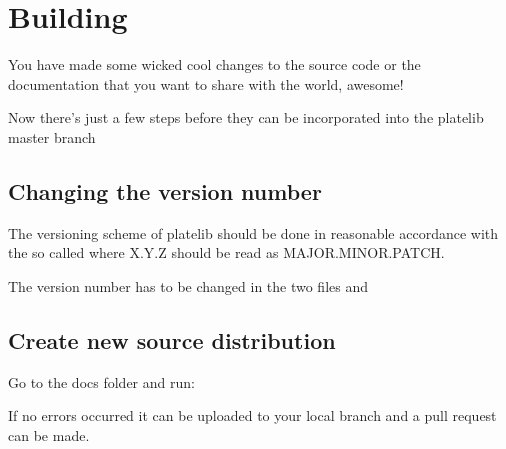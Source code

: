 \documentclass[letterpaper,10pt,english]{sphinxmanual}
\begin{document}
\section{Building}
\label{\detokenize{contribute:building}}\label{\detokenize{contribute:git}}
You have made some wicked cool changes to the source code
or the documentation that you want to share with the world, awesome!

Now there’s just a few steps before they can be incorporated into
the platelib master branch


\subsection{Changing the version number}
\label{\detokenize{contribute:changing-the-version-number}}
The versioning scheme of platelib should be done in reasonable
accordance with the so called  where
X.Y.Z should be read as MAJOR.MINOR.PATCH.

The version number has to be changed in the two files  and


\subsection{Create new source distribution}
\label{\detokenize{contribute:semantic-versioning}}\label{\detokenize{contribute:create-new-source-distribution}}
Go to the docs folder and run:

%
\begin{sphinxVerbatim}[commandchars=\\\{\}]
\end{sphinxVerbatim}

If no errors occurred it can be uploaded to your local branch and
a pull request can be made.
\end{document}
